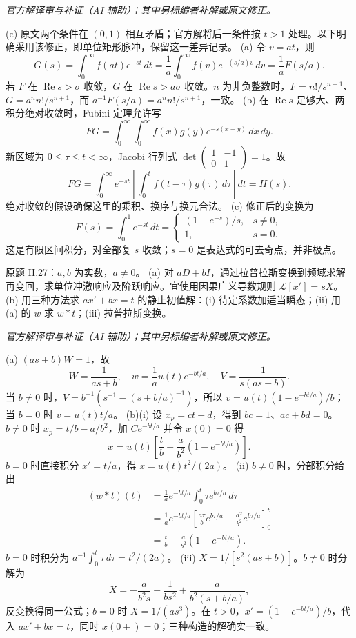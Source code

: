 \begin{solution}
\textit{官方解译审与补证（AI 辅助）；其中另标编者补解或原文修正。}\par

(c) 原文两个条件在 $(0,1)$ 相互矛盾；官方解将后一条件按 $t>1$ 处理。以下明确采用该修正，即单位矩形脉冲，保留这一差异记录。
(a) 令 $v=at$，则
\[G(s)=\int_0^\infty f(at)e^{-st}\,dt=\frac1a\int_0^\infty f(v)e^{-(s/a)v}\,dv=\frac1aF(s/a).\]
若 $F$ 在 $\operatorname{Re}s>\sigma$ 收敛，$G$ 在 $\operatorname{Re}s>a\sigma$ 收敛。$n$ 为非负整数时，$F=n!/s^{n+1}$、$G=a^nn!/s^{n+1}$，而 $a^{-1}F(s/a)=a^nn!/s^{n+1}$，一致。
(b) 在 $\operatorname{Re}s$ 足够大、两积分绝对收敛时，Fubini 定理允许写
\[FG=\int_0^\infty\int_0^\infty f(x)g(y)e^{-s(x+y)}\,dx\,dy.\]
新区域为 $0\le\tau\le t<\infty$，Jacobi 行列式 $\det\begin{pmatrix}1&-1\\0&1\end{pmatrix}=1$。故
\[FG=\int_0^\infty e^{-st}\left[\int_0^t f(t-\tau)g(\tau)\,d\tau\right]dt=H(s).\]
绝对收敛的假设确保这里的乘积、换序与换元合法。
(c) 修正后的变换为
\[F(s)=\int_0^1 e^{-st}\,dt=\begin{cases}(1-e^{-s})/s,&s\ne0,\\1,&s=0.\end{cases}\]
这是有限区间积分，对全部复 $s$ 收敛；$s=0$ 是表达式的可去奇点，并非极点。
\end{solution}
\begin{exercise}\label{cw:ps7-II-27}原题 II.27：$a,b$ 为实数，$a\ne0$。
(a) 对 $aD+bI$，通过拉普拉斯变换到频域求解再变回，求单位冲激响应及阶跃响应。宜使用因果广义导数规则 $\mathcal L[x']=sX$。
(b) 用三种方法求 $ax'+bx=t$ 的静止初值解：(i) 待定系数加适当瞬态；(ii) 用 (a) 的 $w$ 求 $w*t$；(iii) 拉普拉斯变换。\end{exercise}
\begin{solution}
\textit{官方解译审与补证（AI 辅助）；其中另标编者补解或原文修正。}\par

(a) $(as+b)W=1$，故
\[W=\frac1{as+b},\quad w=\frac1a u(t)e^{-bt/a},\quad V=\frac1{s(as+b)}.\]
当 $b\ne0$ 时，$V=b^{-1}(s^{-1}-(s+b/a)^{-1})$，所以 $v=u(t)(1-e^{-bt/a})/b$；当 $b=0$ 时 $v=u(t)t/a$。
(b)(i) 设 $x_p=ct+d$，得到 $bc=1$、$ac+bd=0$。$b\ne0$ 时 $x_p=t/b-a/b^2$，加 $Ce^{-bt/a}$ 并令 $x(0)=0$ 得
\[x=u(t)\left[\frac tb-\frac a{b^2}(1-e^{-bt/a})\right].\]
$b=0$ 时直接积分 $x'=t/a$，得 $x=u(t)t^2/(2a)$。
(ii) $b\ne0$ 时，分部积分给出
\begin{align*}
(w*t)(t)&=\frac1a e^{-bt/a}\int_0^t\tau e^{b\tau/a}\,d\tau\\
&=\frac1a e^{-bt/a}\left[\frac{a\tau}{b}e^{b\tau/a}-\frac{a^2}{b^2}e^{b\tau/a}\right]_0^t\\
&=\frac tb-\frac a{b^2}(1-e^{-bt/a}).
\end{align*}
$b=0$ 时积分为 $a^{-1}\int_0^t\tau\,d\tau=t^2/(2a)$。
(iii) $X=1/[s^2(as+b)]$。$b\ne0$ 时分解为
\[X=-\frac a{b^2s}+\frac1{bs^2}+\frac a{b^2(s+b/a)},\]
反变换得同一公式；$b=0$ 时 $X=1/(as^3)$。在 $t>0$，$x'=(1-e^{-bt/a})/b$，代入 $ax'+bx=t$，同时 $x(0+)=0$；三种构造的解确实一致。
\end{solution}
